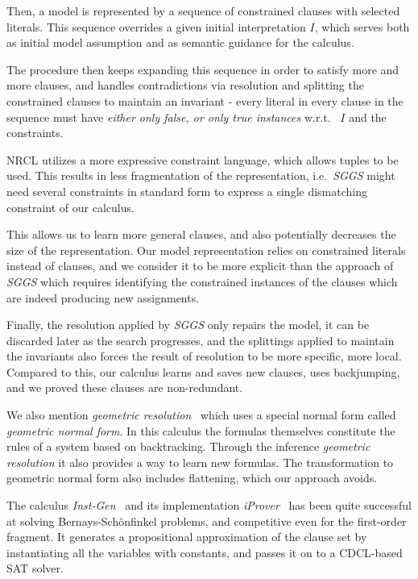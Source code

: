 \documentclass[a4paper]{article}
\newcommand{\mEPR}{Bernays-Sch\"onfinkel}
\newcommand{\ie}{i.e.\ }
\newcommand{\wrt}{w.r.t.\ }
\begin{document}
Then, a model is represented by a sequence of constrained clauses with selected literals. 
This sequence overrides a given initial interpretation $I$, 
which serves both as initial model assumption and as semantic guidance for the calculus.

The procedure then keeps expanding this sequence in order to satisfy more and more clauses, and handles contradictions via resolution and splitting 
the constrained clauses to maintain an invariant - 
every literal in every clause in the sequence must have \emph{either only false, or only true instances} \wrt 
$I$ and the constraints.

NRCL utilizes a more expressive constraint language, which allows tuples to be used.
This results in less fragmentation of the representation, \ie \emph{SGGS} might need several constraints in standard form
to express a single dismatching constraint of our calculus. 

This allows us to learn more general clauses, and also potentially decreases the size of the representation. 
Our model representation relies on constrained literals instead of clauses, and we consider it to be more
explicit than the approach of \emph{SGGS} which requires identifying the constrained instances of the clauses which are indeed
producing new assignments.

Finally, the resolution applied by \emph{SGGS} only repairs the model, it can be discarded later as the search progresses, and the splittings applied to maintain the invariants 
also forces the result of resolution to be more specific, more local. 
Compared to this, our calculus learns and saves new clauses, uses backjumping, and we proved these clauses are non-redundant.

We also mention \emph{geometric resolution}~\cite{GeoRes06} which uses a special normal form called \emph{geometric normal form}. In this calculus the formulas
themselves constitute the rules of a system based on backtracking. 
Through the inference \emph{geometric resolution} it also provides a way to learn new formulas.
The transformation to geometric normal form also includes flattening, 
which our approach avoids.

The calculus \emph{Inst-Gen}~\cite{InstGen03} and its implementation \emph{iProver}~\cite{iProver08} 
has been quite successful at solving {\mEPR} problems, and competitive even for the first-order fragment.
It generates a propositional approximation of the clause set by instantiating all the variables with constants, 
and passes it on to a CDCL-based SAT solver. 
\end{document}

